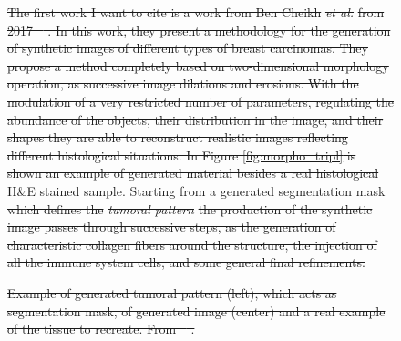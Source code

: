 \documentclass[12pt,a4paper]{report}
\providecommand{\DIFdeltex}[1]{{\protect\color{red}\sout{#1}}}                      %
\providecommand{\DIFdelFL}[1]{\DIFdel{#1}} %
\providecommand{\DIFdel}[1]{\texorpdfstring{\DIFdeltex{#1}}{}} %
\begin{document}
\begin{figure}
\DIFdel{The first work I want to cite is a work from Ben Cheikh }\textit{\DIFdel{et al.}} %
\DIFdel{from 2017 \mbox{%
\cite{10.1117/12.2254452}}\hspace{0pt}%
. In this work, they present a methodology for the generation of synthetic images of different types of breast carcinomas. They propose a method completely based on two-dimensional morphology operation, as successive image dilations and erosions. With the modulation of a very restricted number of parameters, regulating the abundance of the objects, their distribution in the image, and their shapes they are able to reconstruct realistic images reflecting different histological situations. In Figure \ref{fig:morpho_tripl} is shown an example of generated material besides a real histological H\&E stained sample. Starting from a generated segmentation mask which defines the }\textit{\DIFdel{tumoral pattern}} %
\DIFdel{the production of the synthetic image passes through successive steps, as the generation of characteristic collagen fibers around the structure, the injection of all the immune system cells, and some general
final refinements.
}%

{%
}
{%
}
{%
}
{%
\DIFdelFL{Example of generated tumoral pattern (left), which acts as segmentation mask, of generated image (center) and a real example of the tissue to recreate. From \mbox{%
\cite{10.1117/12.2254452}}\hspace{0pt}%
.}}


\end{figure}
\end{document}
